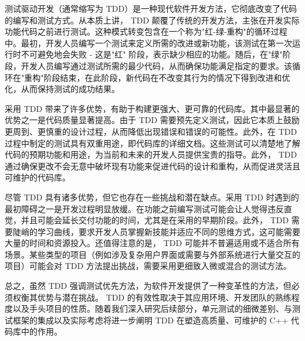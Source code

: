 测试驱动开发（通常缩写为 TDD）是一种现代软件开发方法，它彻底改变了代码的编写和测试方式。从本质上讲， TDD 颠覆了传统的开发方法，主张在开发实际功能代码之前进行测试。这种模式转变包含在一个称为"红-绿-重构"的循环过程中。最初，开发人员编写一个测试来定义所需的改进或新功能，该测试在第一次运行时不可避免地会失败 - 这是"红" 阶段，表示缺少相应的功能。随后，在"绿"阶段，开发人员编写通过测试所需的最少代码，从而确保功能满足指定的要求。该循环在"重构"阶段结束，在此阶段，新代码在不改变其行为的情况下得到改进和优化，从而保持测试的成功结果。

采用 TDD 带来了许多优势，有助于构建更强大、更可靠的代码库。其中最显著的优势之一是代码质量显著提高。由于 TDD 需要预先定义测试，因此它本质上鼓励更周到、更慎重的设计过程，从而降低出现错误和错误的可能性。此外，在 TDD 过程中制定的测试具有双重用途，即代码库的详细文档。这些测试可以清楚地了解代码的预期功能和用途，为当前和未来的开发人员提供宝贵的指导。此外， TDD 通过确保更改不会无意中破坏现有功能来促进代码的设计和重构，从而促进灵活且可维护的代码库。

尽管 TDD 具有诸多优势，但它也存在一些挑战和潜在缺点。采用 TDD 时遇到的最初障碍之一是开发过程明显放缓。在功能之前编写测试可能会让人觉得违反直觉，并且可能会延长交付功能的时间，尤其是在采用的早期阶段。此外， TDD 需要陡峭的学习曲线，要求开发人员掌握新技能并适应不同的思维方式，这可能需要大量的时间和资源投入。还值得注意的是， TDD 可能并不普遍适用或不适合所有场景。某些类型的项目（例如涉及复杂用户界面或需要与外部系统进行大量交互的项目）可能会对 TDD 方法提出挑战，需要采用更细致入微或混合的测试方法。

总之，虽然 TDD 强调测试优先方法，为软件开发提供了一种变革性的方法，但必须权衡其优势与潜在挑战。 TDD 的有效性取决于其应用环境、开发团队的熟练程度以及手头项目的性质。随着我们深入研究后续部分，单元测试的细微差别、与测试框架的集成以及实际考虑将进一步阐明 TDD 在塑造高质量、可维护的 C++ 代码库中的作用。
